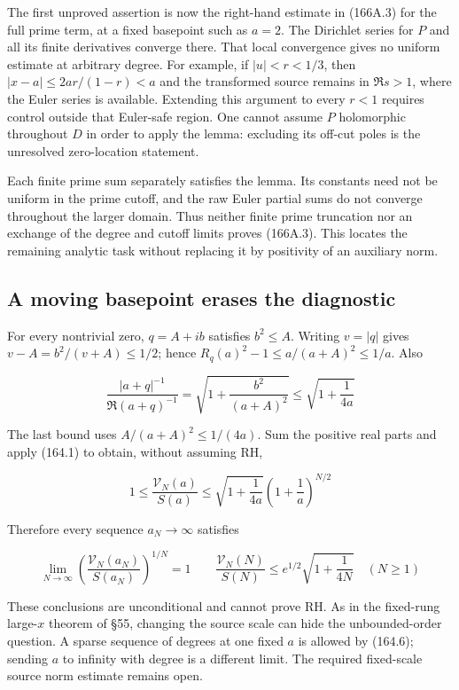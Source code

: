 \documentclass[
  11pt,
]{book}
\begin{document}
The first unproved assertion is now the right-hand estimate in (166A.3)
for the full prime term, at a fixed basepoint such as \(a=2\). The
Dirichlet series for \(P\) and all its finite derivatives converge
there. That local convergence gives no uniform estimate at arbitrary
degree. For example, if \(|u|<r<1/3\), then \(|x-a|\le2ar/(1-r)<a\) and
the transformed source remains in \(\Re s>1\), where the Euler series is
available. Extending this argument to every \(r<1\) requires control
outside that Euler-safe region. One cannot assume \(P\) holomorphic
throughout \(D\) in order to apply the lemma: excluding its off-cut
poles is the unresolved zero-location statement.

Each finite prime sum separately satisfies the lemma. Its constants need
not be uniform in the prime cutoff, and the raw Euler partial sums do
not converge throughout the larger domain. Thus neither finite prime
truncation nor an exchange of the degree and cutoff limits proves
(166A.3). This locates the remaining analytic task without replacing it
by positivity of an auxiliary norm.

\subsection{A moving basepoint erases the
diagnostic}\label{a-moving-basepoint-erases-the-diagnostic}

For every nontrivial zero, \(q=A+ib\) satisfies \(b^2\le A\). Writing
\(v=|q|\) gives \(v-A=b^2/(v+A)\le1/2\); hence
\(R_q(a)^2-1\le a/(a+A)^2\le1/a\). Also

\[
\frac{|a+q|^{-1}}{\Re(a+q)^{-1}}
=\sqrt{1+\frac{b^2}{(a+A)^2}}
\le\sqrt{1+\frac1{4a}}
\tag{166A.4}
\]

The last bound uses \(A/(a+A)^2\le1/(4a)\). Sum the positive real parts
and apply (164.1) to obtain, without assuming RH,

\[
\boxed{1\le\frac{\mathcal V_N(a)}{S(a)}
\le\sqrt{1+\frac1{4a}}\left(1+\frac1a\right)^{N/2}}
\tag{166A.5}
\]

Therefore every sequence \(a_N\to\infty\) satisfies

\[
\lim_{N\to\infty}
\left(\frac{\mathcal V_N(a_N)}{S(a_N)}\right)^{1/N}=1
\qquad
\frac{\mathcal V_N(N)}{S(N)}\le e^{1/2}\sqrt{1+\frac1{4N}}
\quad(N\ge1)
\tag{166A.6}
\]

These conclusions are unconditional and cannot prove RH. As in the
fixed-rung large-\(x\) theorem of §55, changing the source scale can
hide the unbounded-order question. A sparse sequence of degrees at one
fixed \(a\) is allowed by (164.6); sending \(a\) to infinity with degree
is a different limit. The required fixed-scale source norm estimate
remains open.
\end{document}

